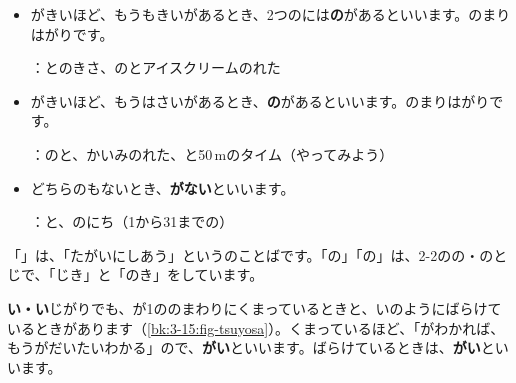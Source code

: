 \begin{itemize}[leftmargin=1.4\zw, itemsep=2pt, topsep=2pt, label={\color{bkBlue}●}]
\item {}がきいほど、もうもきいがあるとき、2つのには\textbf{の}があるといいます。のまりはがりです。\par
{}：とのきさ、のとアイスクリームのれた
\item {}がきいほど、もうはさいがあるとき、\textbf{の}があるといいます。のまりはがりです。\par
{}：のと、かいみのれた、と50\,mのタイム（やってみよう）
\item どちらのもないとき、\textbf{がない}といいます。\par
{}：と、のにち（1から31までの）
\end{itemize}
「」は、「たがいにしあう」というのことばです。「の」「の」は、2-2のの・のとじで、「じき」と「のき」をしています。

\textbf{い・い}\quad {}じがりでも、が1ののまわりにくまっているときと、いのようにばらけているときがあります（\ref{bk:3-15:fig-tsuyosa}）。くまっているほど、「がわかれば、もうがだいたいわかる」ので、\textbf{がい}といいます。ばらけているときは、\textbf{がい}といいます。

